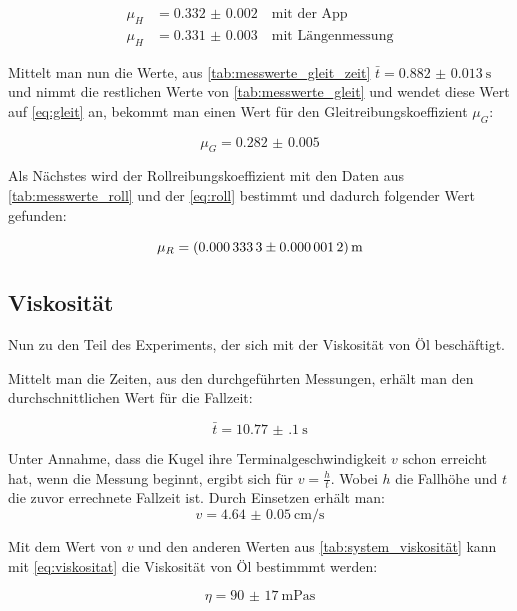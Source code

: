 \documentclass[11pt,ngerman]{scrartcl}
\begin{document}
\begin{align}
    \mu_H &= \num{0.332(2)} \quad \text{mit der App} \\
    \mu_H &= \num{0.331(3)} \quad \text{mit Längenmessung}
\end{align}

Mittelt man nun die Werte, aus \autoref{tab:messwerte_gleit_zeit}
$\bar{t}=\SI{0.882(13)}{\second}$ und nimmt die restlichen Werte von
\autoref{tab:messwerte_gleit} und wendet diese Wert auf \autoref{eq:gleit} an,
bekommt man einen Wert für den Gleitreibungskoeffizient $\mu_G$:

\begin{equation}
    \mu_G = \num{0.282(5)}
\end{equation}

Als Nächstes wird der Rollreibungskoeffizient mit den Daten aus \autoref{tab:messwerte_roll}
und der \autoref{eq:roll} bestimmt und dadurch folgender Wert gefunden:

\begin{equation}
    \mu_R = \SI{0.0003333+-0.0000012}{\meter}
\end{equation}

\subsection{Viskosität}
Nun zu den Teil des Experiments, der sich mit der Viskosität von Öl
beschäftigt. 

Mittelt man die Zeiten, aus den durchgeführten Messungen, erhält
man den durchschnittlichen Wert für die Fallzeit: 

\begin{equation}
    \bar{t} = \SI{10.77(10)}{\second}
\end{equation}

Unter Annahme, dass die Kugel ihre Terminalgeschwindigkeit $v$ schon
erreicht hat, wenn die Messung beginnt, ergibt sich für $v=\frac{h}{t}$. Wobei
$h$ die Fallhöhe und $t$ die zuvor errechnete Fallzeit ist. Durch
Einsetzen erhält man:
\begin{equation}
    v = \SI{4.64(5)}{\cm\per\second}
\end{equation}

Mit dem Wert von $v$ und den anderen Werten aus \autoref{tab:system_viskosität}
kann mit \autoref{eq:viskositat} die Viskosität von Öl bestimmmt werden:

\begin{equation}
    \eta = \SI{90(17)}{\milli\Pa\second}
\end{equation}
\end{document}
